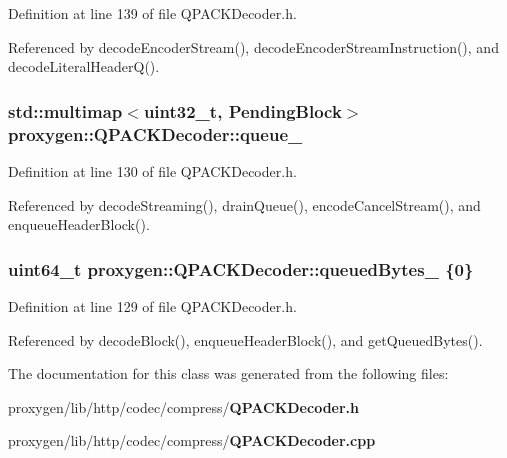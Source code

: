 Definition at line 139 of file Q\+P\+A\+C\+K\+Decoder.\+h.



Referenced by decode\+Encoder\+Stream(), decode\+Encoder\+Stream\+Instruction(), and decode\+Literal\+Header\+Q().

\subsubsection[{queue\+\_\+}]{\setlength{\rightskip}{0pt plus 5cm}std\+::multimap$<$uint32\+\_\+t, {\bf Pending\+Block}$>$ proxygen\+::\+Q\+P\+A\+C\+K\+Decoder\+::queue\+\_\+\hspace{0.3cm}{\ttfamily [private]}}\label{classproxygen_1_1QPACKDecoder_afbdfc960c632176783664308fcebbb8e}


Definition at line 130 of file Q\+P\+A\+C\+K\+Decoder.\+h.



Referenced by decode\+Streaming(), drain\+Queue(), encode\+Cancel\+Stream(), and enqueue\+Header\+Block().

\subsubsection[{queued\+Bytes\+\_\+}]{\setlength{\rightskip}{0pt plus 5cm}uint64\+\_\+t proxygen\+::\+Q\+P\+A\+C\+K\+Decoder\+::queued\+Bytes\+\_\+ \{0\}\hspace{0.3cm}{\ttfamily [private]}}\label{classproxygen_1_1QPACKDecoder_af51417abeba336c484a14c9d2783bd67}


Definition at line 129 of file Q\+P\+A\+C\+K\+Decoder.\+h.



Referenced by decode\+Block(), enqueue\+Header\+Block(), and get\+Queued\+Bytes().



The documentation for this class was generated from the following files\+:\begin{DoxyCompactItemize}
\item 
proxygen/lib/http/codec/compress/{\bf Q\+P\+A\+C\+K\+Decoder.\+h}\item 
proxygen/lib/http/codec/compress/{\bf Q\+P\+A\+C\+K\+Decoder.\+cpp}\end{DoxyCompactItemize}
